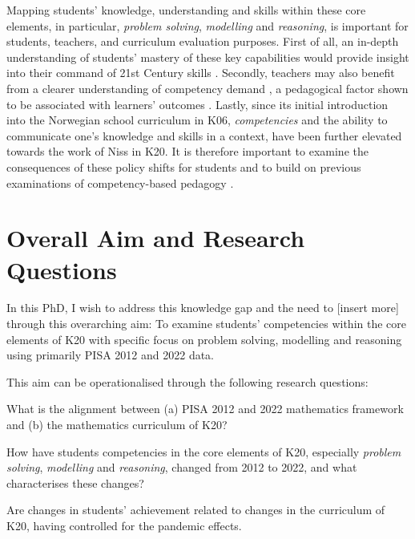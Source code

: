 \documentclass[
    a4paper,                %
    11pt,                   %
    stu,                    %
    donotrepeattitle,       %
    floatsintext,           %
    biblatex,               %
    colorlinks=true,        %
    linkcolor=red,          %
    anchorcolor=black,      %
    citecolor=blue,         %
    urlcolor=blue,          %
    bookmarks=true,         %
    bookmarksopen=false,    %
    bookmarksnumbered=true, %
    dvipsnames              %
]{apa7}
\begin{document}
Mapping students' knowledge, understanding and skills within these core elements, in particular, \emph{problem solving}, \emph{modelling} and \emph{reasoning}, is important for students, teachers, and curriculum evaluation purposes. First of all, an in-depth understanding of students' mastery of these key capabilities would provide insight into their command of 21st Century skills \parencite[][p. 31]{oecd:2018}. Secondly, teachers may also benefit from a clearer understanding of competency demand \parencite{pettersen:2018}, a pedagogical factor shown to be associated with learners' outcomes \parencite{pettersen:2019}. Lastly, since its initial introduction into the Norwegian school curriculum in K06, \emph{competencies} and the ability to communicate one's knowledge and skills in a context, have been further elevated towards the work of Niss in K20. It is therefore important to examine the consequences of these policy shifts for students and to build on previous examinations of competency-based pedagogy \parencite{pettersen:2018}.




\section{Overall Aim and Research Questions}

In this PhD, I wish to address this knowledge gap and the need to [insert more] through this overarching aim: To examine students' competencies within the core elements of K20 with specific focus on problem solving, modelling and reasoning using primarily PISA 2012 and 2022 data.

This aim can be operationalised through the following research questions:
\begin{APAenumerate}
    \item What is the alignment between (a) PISA 2012 and 2022 mathematics framework and (b) the mathematics curriculum of K20?
    \item How have students competencies in the core elements of K20, especially \emph{problem solving}, \emph{modelling} and \emph{reasoning}, changed from  2012 to 2022, and what characterises these changes?
    \item Are changes in students' achievement related to changes in the curriculum of K20, having controlled for the pandemic effects.
\end{APAenumerate}
\end{document}
